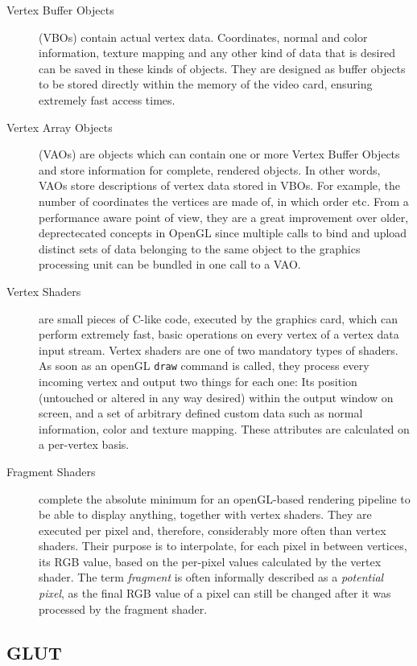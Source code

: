 \begin{description}
	\item[Vertex Buffer Objects] (VBOs) contain actual vertex data. Coordinates, normal and color information, texture mapping and any other kind of data that is desired can be saved in these kinds of objects. They are designed as buffer objects to be stored directly within the memory of the video card, ensuring extremely fast access times.
	\item[Vertex Array Objects] (VAOs) are objects which can contain one or more Vertex Buffer Objects and store information for complete, rendered objects. In other words, VAOs store descriptions of vertex data stored in VBOs. For example, the number of coordinates the vertices are made of, in which order etc. From a performance aware point of view, they are a great improvement over older, deprectecated concepts in OpenGL since multiple calls to bind and upload distinct sets of data belonging to the same object to the graphics processing unit can be bundled in one call to a VAO.

	\item[Vertex Shaders] are small pieces of C-like code, executed by the graphics card, which can perform extremely fast, basic operations on every vertex of a vertex data input stream. Vertex shaders are one of two mandatory types of shaders. As soon as an openGL \texttt{draw} command is called, they process every incoming vertex and output two things for each one: Its position (untouched or altered in any way desired) within the output window on screen, and a set of arbitrary defined custom data such as normal information, color and texture mapping. These attributes are calculated on a per-vertex basis.

	\item[Fragment Shaders] complete the absolute minimum for an openGL-based rendering pipeline to be able to display anything, together with vertex shaders. They are executed per pixel and, therefore, considerably more often than vertex shaders. Their purpose is to interpolate, for each pixel in between vertices, its RGB value, based on the per-pixel values calculated by the vertex shader. The term \textit{fragment} is often informally described as a \textit{potential pixel}, as the final RGB value of a pixel can still be changed after it was processed by the fragment shader.

\end{description}

\subsection{GLUT}
\label{sec:glut}

